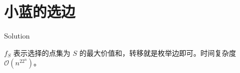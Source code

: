 \section{小蓝的选边}

\begin{frame}{Solution}

$f_S$ 表示选择的点集为 $S$ 的最大价值和，转移就是枚举边即可。时间复杂度 $\mathcal O(n^22^n)$。

\end{frame}